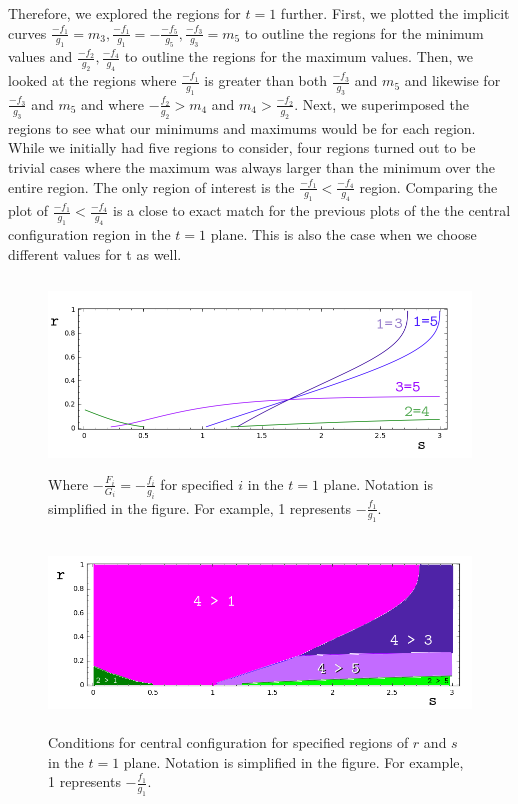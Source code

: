 \documentclass[11pt,leqno]{article}
\theoremstyle{definition}
\theoremstyle{remark}
\numberwithin{equation}{section}
\begin{document}
Therefore, we explored the regions for $t = 1$ further. First, we plotted the implicit curves $\frac{-f_1}{g_1}=m_3,\frac{-f_1}{g_1}=-\frac{-f_5}{g_5},\frac{-f_3}{g_3}=m_5$ to outline the regions for the minimum values and $\frac{-f_2}{g_2},\frac{-f_4}{g_4}$ to outline the regions for the maximum values. Then, we looked at the regions where $\frac{-f_1}{g_1}$ is greater than both $\frac{-f_3}{g_3}$ and $m_5$ and likewise for $\frac{-f_3}{g_3}$ and $m_5$ and where $-\frac{f_2}{g_2}>m_4$ and $m_4>\frac{-f_2}{g_2}$. Next, we superimposed the regions to see what our minimums and maximums would be for each region. While we initially had five regions to consider, four regions turned out to be trivial cases where the maximum was always larger than the minimum over the entire region. The only region of interest is the $\frac{-f_1}{g_1} < \frac{-f_4}{g_4}$ region. Comparing the plot of $\frac{-f_1}{g_1} < \frac{-f_4}{g_4}$ is a close to exact match for the previous plots of the the central configuration region in the $t=1$ plane. This is also the case when we choose different values for t as well.



\begin{center}

\begin{figure}
\includegraphics[width=6in, height=2in]{t1regionOutline.png}
 \caption{ \label{EL}  Where $-\frac{F_i}{G_i}=-\frac{f_i}{g_i}$ for specified $i$ in the $t=1$ plane. Notation is simplified in the figure. For example, 1 represents $-\frac{f_1}{g_1}$.} 
\end{figure}

\begin{figure}
\includegraphics[width=6in, height=2in]{t1rG0region.png}
 \caption{ \label{EL}  Conditions for central configuration for specified regions of $r$ and $s$ in the $t=1$ plane. Notation is simplified in the figure. For example, 1 represents $-\frac{f_1}{g_1}$.}
\end{figure}

\end{center}
\end{document}
